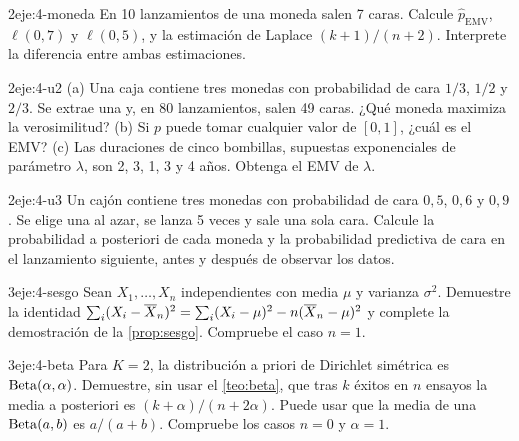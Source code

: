 \begin{ejercicio}{2}{eje:4-moneda}
En 10 lanzamientos de una moneda salen 7 caras. Calcule $\hat p_{\mathrm{EMV}}$, $\ell(0{,}7)$ y $\ell(0{,}5)$, y la estimación de Laplace $(k+1)/(n+2)$. Interprete la diferencia entre ambas estimaciones.
\end{ejercicio}

\begin{ejercicio}{2}{eje:4-u2}
(a) Una caja contiene tres monedas con probabilidad de cara $1/3$, $1/2$ y $2/3$. Se extrae una y, en 80 lanzamientos, salen 49 caras. ¿Qué moneda maximiza la verosimilitud? (b) Si $p$ puede tomar cualquier valor de $[0,1]$, ¿cuál es el EMV? (c) Las duraciones de cinco bombillas, supuestas exponenciales de parámetro $\lambda$, son 2, 3, 1, 3 y 4 años. Obtenga el EMV de $\lambda$.
\end{ejercicio}

\begin{ejercicio}{2}{eje:4-u3}
Un cajón contiene tres monedas con probabilidad de cara $0{,}5$, $0{,}6$ y $0{,}9$. Se elige una al azar, se lanza 5 veces y sale una sola cara. Calcule la probabilidad a posteriori de cada moneda y la probabilidad predictiva de cara en el lanzamiento siguiente, antes y después de observar los datos.
\end{ejercicio}

\begin{ejercicio}{3}{eje:4-sesgo}
Sean $X_1,\dots,X_n$ independientes con media $\mu$ y varianza $\sigma^{2}$. Demuestre la identidad $\sum_i(X_i-\overline{X}_n)^{2}=\sum_i(X_i-\mu)^{2}-n(\overline{X}_n-\mu)^{2}$ y complete la demostración de la \cref{prop:sesgo}. Compruebe el caso $n=1$.
\end{ejercicio}

\begin{ejercicio}{3}{eje:4-beta}
Para $K=2$, la distribución a priori de Dirichlet simétrica es $\operatorname{Beta}(\alpha,\alpha)$. Demuestre, sin usar el \cref{teo:beta}, que tras $k$ éxitos en $n$ ensayos la media a posteriori es $(k+\alpha)/(n+2\alpha)$. Puede usar que la media de una $\operatorname{Beta}(a,b)$ es $a/(a+b)$. Compruebe los casos $n=0$ y $\alpha=1$.
\end{ejercicio}
